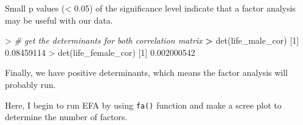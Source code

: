 \documentclass[
]{article}
\newenvironment{Shaded}{\begin{snugshade}}{\end{snugshade}}
\newcommand{\CommentTok}[1]{\textcolor[rgb]{0.56,0.35,0.01}{\textit{#1}}}
\newcommand{\DecValTok}[1]{\textcolor[rgb]{0.00,0.00,0.81}{#1}}
\newcommand{\ErrorTok}[1]{\textcolor[rgb]{0.64,0.00,0.00}{\textbf{#1}}}
\newcommand{\FloatTok}[1]{\textcolor[rgb]{0.00,0.00,0.81}{#1}}
\newcommand{\FunctionTok}[1]{\textcolor[rgb]{0.00,0.00,0.00}{#1}}
\newcommand{\NormalTok}[1]{#1}
\newcommand{\SpecialCharTok}[1]{\textcolor[rgb]{0.00,0.00,0.00}{#1}}
\begin{document}
\begin{Shaded}
\end{Shaded}

Small p values (\textless{} 0.05) of the significance level indicate
that a factor analysis may be useful with our data.

\begin{Shaded}
\begin{Highlighting}[]
\SpecialCharTok{\textgreater{}} \CommentTok{\# get the determinants for both correlation matrix}
\ErrorTok{\textgreater{}} \FunctionTok{det}\NormalTok{(life\_male\_cor)}
\NormalTok{[}\DecValTok{1}\NormalTok{] }\FloatTok{0.08459114}
\SpecialCharTok{\textgreater{}} \FunctionTok{det}\NormalTok{(life\_female\_cor)}
\NormalTok{[}\DecValTok{1}\NormalTok{] }\FloatTok{0.002000542}
\end{Highlighting}
\end{Shaded}

Finally, we have positive determinants, which means the factor analysis
will probably run.

Here, I begin to run EFA by using \texttt{fa()} function and make a
scree plot to determine the number of factors.
\end{document}
